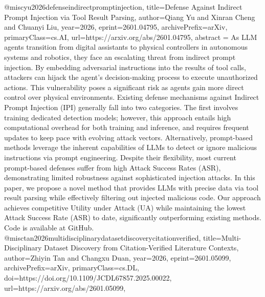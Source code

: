 {}@misc{yu2026defenseindirectpromptinjection,
      title={Defense Against Indirect Prompt Injection via Tool Result Parsing}, 
      author={Qiang Yu and Xinran Cheng and Chuanyi Liu},
      year={2026},
      eprint={2601.04795},
      archivePrefix={arXiv},
      primaryClass={cs.AI},
      url={https://arxiv.org/abs/2601.04795},
      abstract = {As LLM agents transition from digital assistants to physical controllers in autonomous systems and robotics, they face an escalating threat from indirect prompt injection. By embedding adversarial instructions into the results of tool calls, attackers can hijack the agent's decision-making process to execute unauthorized actions. This vulnerability poses a significant risk as agents gain more direct control over physical environments. Existing defense mechanisms against Indirect Prompt Injection (IPI) generally fall into two categories. The first involves training dedicated detection models; however, this approach entails high computational overhead for both training and inference, and requires frequent updates to keep pace with evolving attack vectors. Alternatively, prompt-based methods leverage the inherent capabilities of LLMs to detect or ignore malicious instructions via prompt engineering. Despite their flexibility, most current prompt-based defenses suffer from high Attack Success Rates (ASR), demonstrating limited robustness against sophisticated injection attacks. In this paper, we propose a novel method that provides LLMs with precise data via tool result parsing while effectively filtering out injected malicious code. Our approach achieves competitive Utility under Attack (UA) while maintaining the lowest Attack Success Rate (ASR) to date, significantly outperforming existing methods. Code is available at GitHub.}
}@misc{tan2026multidisciplinarydatasetdiscoverycitationverified,
      title={Multi-Disciplinary Dataset Discovery from Citation-Verified Literature Contexts}, 
      author={Zhiyin Tan and Changxu Duan},
      year={2026},
      eprint={2601.05099},
      archivePrefix={arXiv},
      primaryClass={cs.DL},
      doi={https://doi.org/10.1109/JCDL67857.2025.00022},
      url={https://arxiv.org/abs/2601.05099},
}
